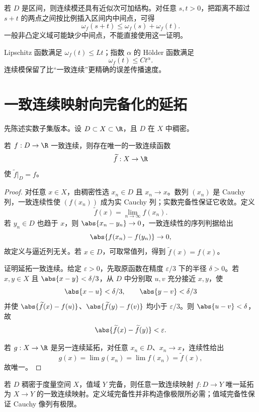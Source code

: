 若 \(D\) 是区间，则连续模还具有近似次可加结构。对任意 \(s,t>0\)，把距离不超过 \(s+t\) 的两点之间按比例插入区间内中间点，可得
\[
 \omega_f(s+t)\le\omega_f(s)+\omega_f(t).
\]
一般非凸定义域可能缺少中间点，不能直接使用这一证明。

\begin{example}
Lipschitz 函数满足 \(\omega_f(t)\le Lt\)；指数 \(\alpha\) 的 Hölder 函数满足
\[
 \omega_f(t)\le Ct^\alpha.
\]
连续模保留了比“一致连续”更精确的误差传播速度。
\end{example}

\section{一致连续映射向完备化的延拓}

先陈述实数子集版本。设 \(D\subset X\subset\R\)，且 \(D\) 在 \(X\) 中稠密。

\begin{theorem}[稠密集上的一致连续延拓]
若 \(f:D\to\R\) 一致连续，则存在唯一的一致连续函数
\[
 \widetilde f:X\to\R
\]
使 \(\widetilde f|_D=f\)。
\end{theorem}

\begin{proof}
对任意 \(x\in X\)，由稠密性选 \(x_n\in D\) 且 \(x_n\to x\)。数列 \((x_n)\) 是 Cauchy 列，一致连续性使 \((f(x_n))\) 成为实 Cauchy 列；实数完备性保证它收敛。定义
\[
 \widetilde f(x)=\lim_{n\to\infty}f(x_n).
\]
若 \(y_n\in D\) 也趋于 \(x\)，则 \(\abs{x_n-y_n}\to0\)，一致连续性的序列判据给出
\[
 \abs{f(x_n)-f(y_n)}\to0,
\]
故定义与逼近列无关。若 \(x\in D\)，可取常值列，得到 \(\widetilde f(x)=f(x)\)。

证明延拓一致连续。给定 \(\varepsilon>0\)，先取原函数在精度 \(\varepsilon/3\) 下的半径 \(\delta>0\)。若 \(x,y\in X\) 且 \(\abs{x-y}<\delta/3\)，从 \(D\) 中分别取 \(u,v\) 充分接近 \(x,y\)，使
\[
 \abs{x-u}<\delta/3,\qquad\abs{y-v}<\delta/3
\]
并使 \(\abs{\widetilde f(x)-f(u)}\)、\(\abs{\widetilde f(y)-f(v)}\) 均小于 \(\varepsilon/3\)。则 \(\abs{u-v}<\delta\)，故
\[
 \abs{\widetilde f(x)-\widetilde f(y)}<\varepsilon.
\]

若 \(g:X\to\R\) 是另一连续延拓，对任意 \(x_n\in D\)、\(x_n\to x\)，连续性给出
\[
 g(x)=\lim g(x_n)=\lim f(x_n)=\widetilde f(x),
\]
故唯一。
\end{proof}

\begin{remark}[度量空间版本]
若 \(D\) 稠密于度量空间 \(X\)，值域 \(Y\) 完备，则任意一致连续映射 \(f:D\to Y\) 唯一延拓为 \(X\to Y\) 的一致连续映射。定义域完备性并非构造像极限所必需；值域完备性保证 Cauchy 像列有极限。
\end{remark}

